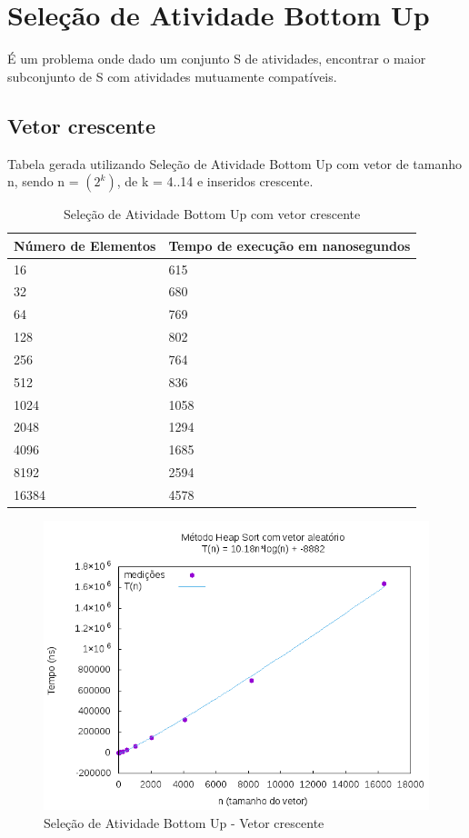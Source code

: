 \documentclass[12pt,a4paper,twoside]{report}
\begin{document}
\section{Seleção de Atividade Bottom Up}

É um problema onde dado um conjunto S de atividades, encontrar o maior subconjunto de S com
atividades mutuamente compatíveis.

\subsection{Vetor crescente}
Tabela gerada utilizando Seleção de Atividade Bottom Up com vetor de tamanho n, sendo n = $(2^k)$, de k = 4..14 e inseridos crescente.
\begin{table}[H]
\centering
\caption{Seleção de Atividade Bottom Up com vetor crescente}
\label{my-label}
\begin{tabular}{|l|l|}
\hline
\multicolumn{1}{|c|}{\textbf{Número de Elementos}} & \multicolumn{1}{c|}{\textbf{Tempo de execução em nanosegundos}} \\ \hline
16 & 615 \\ \hline
32 & 680 \\ \hline
64 & 769 \\ \hline
128 & 802 \\ \hline
256 & 764 \\ \hline
512 & 836 \\ \hline
1024 & 1058 \\ \hline
2048 & 1294 \\ \hline
4096 & 1685 \\ \hline
8192 & 2594 \\ \hline
16384 & 4578 \\ \hline

\end{tabular}
\end{table}

\begin{figure}[H]
    \centering
    \includegraphics[width=0.7\linewidth]{graficos/HeapSort/vIntAleatorio/vIntAleatorio.png}
  \caption{Seleção de Atividade Bottom Up - Vetor crescente}
\end{figure}
\end{document}

